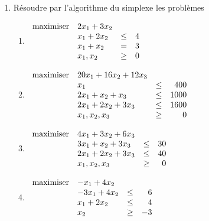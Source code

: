 \begin{enumerate}
  \item
    Résoudre par l'algorithme du simplexe les problèmes
    \begin{enumerate}
      \item
        $
        \begin{array}{llcr}
          \mbox{maximiser} & 2x_1+3x_2\\
                & x_1+2x_2 & \leq & 4\\
                & x_1+x_2 & = & 3\\
                & x_1, x_2& \geq & 0
        \end{array}
        $
      \item
        $
        \begin{array}{llcr}
          \mbox{maximiser} & 20 x_1+16x_2+12 x_3\\
                & x_1  & \leq & 400\\
                &2x_1+x_2+x_3 & \leq & 1000\\
                &2x_1+2x_2+ 3x_3 & \leq & 1600\\
                & x_1, x_2, x_3 & \geq & 0
        \end{array}
        $
      \item
        $
        \begin{array}{llcr}
          \mbox{maximiser} & 4x_1+3x_2+6x_3\\
                & 3x_1+x_2+3x_3 & \leq & 30\\
                & 2x_1+2x_2+3x_3 & \leq & 40\\
                & x_1, x_2, x_3 & \geq & 0
        \end{array}
        $
      \item
        $
        \begin{array}{llcr}
          \mbox{maximiser} & -x_1+4x_2\\
                & -3x_1+4x_2 & \leq & 6\\
                & x_1+2x_2 & \leq & 4\\
                & x_2& \geq & -3
        \end{array}
        $
    \end{enumerate}


\end{enumerate}
